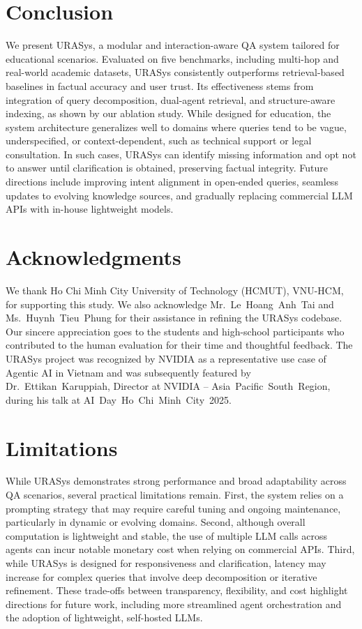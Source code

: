 \documentclass[11pt]{article}
\begin{document}
\section{Conclusion}
\label{sec:conclusion}

We present URASys, a modular and interaction-aware QA system tailored for educational scenarios. Evaluated on five benchmarks, including multi-hop and real-world academic datasets, URASys consistently outperforms retrieval-based baselines in factual accuracy and user trust. Its effectiveness stems from integration of query decomposition, dual-agent retrieval, and structure-aware indexing, as shown by our ablation study. While designed for education, the system architecture generalizes well to domains where queries tend to be vague, underspecified, or context-dependent, such as technical support or legal consultation. In such cases, URASys can identify missing information and opt not to answer until clarification is obtained, preserving factual integrity. Future directions include improving intent alignment in open-ended queries, seamless updates to evolving knowledge sources, and gradually replacing commercial LLM APIs with in-house lightweight models.

\section*{Acknowledgments}
We thank Ho Chi Minh City University of Technology (HCMUT), VNU-HCM, for supporting this study. We also acknowledge Mr.~Le~Hoang~Anh~Tai and Ms.~Huynh~Tieu~Phung for their assistance in refining the URASys codebase. Our sincere appreciation goes to the students and high-school participants who contributed to the human evaluation for their time and thoughtful feedback. The URASys project was recognized by NVIDIA as a representative use case of Agentic AI in Vietnam and was subsequently featured by Dr.~Ettikan~Karuppiah, Director at NVIDIA -- Asia~Pacific~South~Region, during his talk at AI~Day~Ho~Chi~Minh~City~2025.







\section*{Limitations}

While URASys demonstrates strong performance and broad adaptability across QA scenarios, several practical limitations remain. First, the system relies on a prompting strategy that may require careful tuning and ongoing maintenance, particularly in dynamic or evolving domains. Second, although overall computation is lightweight and stable, the use of multiple LLM calls across agents can incur notable monetary cost when relying on commercial APIs. Third, while URASys is designed for responsiveness and clarification, latency may increase for complex queries that involve deep decomposition or iterative refinement. These trade-offs between transparency, flexibility, and cost highlight directions for future work, including more streamlined agent orchestration and the adoption of lightweight, self-hosted LLMs.
\end{document}
